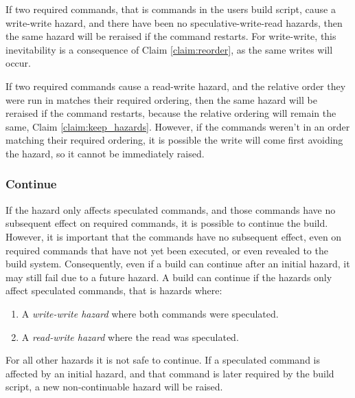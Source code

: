 If two required commands, that is commands in the users build script, cause a write-write hazard, and there have been no speculative-write-read hazards, then the same hazard will be reraised if the command restarts. For write-write, this inevitability is a consequence of Claim \ref{claim:reorder}, as the same writes will occur.

If two required commands cause a read-write hazard, and the relative order they were run in matches their required ordering, then the same hazard will be reraised if the command restarts, because the relative ordering will remain the same, Claim \ref{claim:keep_hazards}. However, if the commands weren't in an order matching their required ordering, it is possible the write will come first avoiding the hazard, so it cannot be immediately raised.

\subsubsection{Continue}
\label{sec:proof:continue}

If the hazard only affects speculated commands, and those commands have no subsequent effect on required commands, it is possible to continue the build. However, it is important that the commands have no subsequent effect, even on required commands that have not yet been executed, or even revealed to the build system. Consequently, even if a build can continue after an initial hazard, it may still fail due to a future hazard. A build can continue if the hazards only affect speculated commands, that is hazards where:

\begin{enumerate}
\item A \emph{write-write hazard} where both commands were speculated.
\item A \emph{read-write hazard} where the read was speculated.
\end{enumerate}

For all other hazards it is not safe to continue. If a speculated command is affected by an initial hazard, and that command is later required by the build script, a new non-continuable hazard will be raised.





